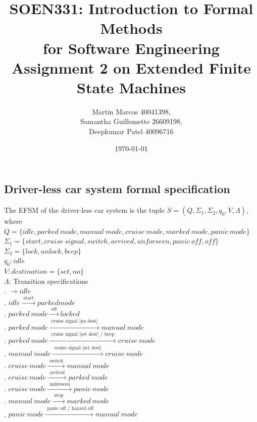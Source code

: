 \documentclass[12pt]{article}
\title{SOEN331: Introduction to Formal Methods\\for Software Engineering\\
Assignment 2 on Extended Finite State Machines}
\author{Martin Marcos 40041398,\\ Samantha Guillemette 26609198,\\ Deepkumar Patel 40096716  }
\date{\today}
\begin{document}
\begin{spacing}{1.5}

\maketitle

\section{Driver-less car system formal specification}

\noindent The EFSM of the driver-less car system is the tuple $S = (Q, \Sigma_1, \Sigma_2, q_0, V, \Lambda)$, where\\

\noindent $Q = \{idle, parked~mode, manual~mode, cruise~mode, marked~mode, panic~mode\}$\\
\noindent $\Sigma_1 = \{start, cruise~signal, switch, arrived, unforseen,panic~off, off\}$\\
\noindent $\Sigma_2 = \{lock, unlock, beep\}$\\
\noindent $q_0: idle$\\
\noindent $V: destination = \{set, no\}$\\
\noindent $\Lambda$: Transition specifications\\
. $\rightarrow idle$\\
. $idle \xrightarrow {\text { start }} parked mode$\\
. $parked~mode  \xrightarrow {\text { off }} locked$\\
. $parked~mode  \xrightarrow {\text { cruise signal [no dest] }} manual~mode$\\
. $parked~mode  \xrightarrow {\text { cruise signal [set dest] / beep }} cruise~mode$\\
. $manual~mode  \xrightarrow {\text { cruise signal [set dest] }} cruise~mode$\\
. $cruise~mode  \xrightarrow {\text { switch }} manual~mode$\\
. $cruise~mode  \xrightarrow {\text { arrived }} parked~mode$\\
. $cruise~mode  \xrightarrow {\text { unforseen }} panic~mode$\\
. $manual~mode  \xrightarrow {\text { stop }} marked~mode$\\
. $panic~mode  \xrightarrow {\text { panic off / hazard off}} manual~mode$\\



\end{spacing}
\end{document}
